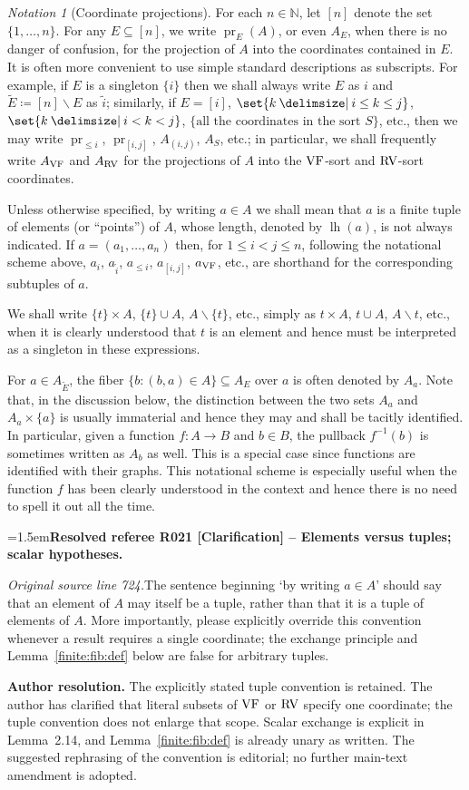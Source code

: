 \documentclass[12pt]{amsart}
\newcommand{\ResolvedRefereeRemark}[5]{%
  \par\medskip\begingroup\normalfont\small\color{gray}%
  \emergencystretch=1.5em\noindent\textbf{Resolved referee R#1 [#2] -- #3.}\par\nobreak\noindent #4\par
  \medskip\color{ResolutionGreen}\noindent\textbf{Author resolution.} #5\par
  \endgroup\medskip
}
\theoremstyle{plain}
\theoremstyle{definition}
\theoremstyle{remark}
\newtheorem{nota}[thm]{Notation}
\numberwithin{equation}{section}
\theoremstyle{plain}
\newcommand{\VF}{\textup{VF}}
\newcommand{\RV}{\textup{RV}}
\DeclareMathOperator{\lh}{lh}
\DeclareMathOperator{\pr}{pr}
\newcommand{\N}{\mathds{N}}
\newcommand{\0}{\emptyset}
\newcommand{\fun}{\longrightarrow}
\newcommand{\sub}{\subseteq}
\newcommand{\mi}{\smallsetminus}
\providecommand\given{}
\newcommand\SetSymbol[1][]{%
\nonscript \: #1 \vert
\allowbreak
\nonscript\:
\mathopen{}}
\renewcommand\given{\SetSymbol[\delimsize]}
\begin{document}
\begin{nota}[Coordinate projections]\label{indexing}
For each $n \in \N$, let $[n]$ denote the set $\{1, \ldots, n\}$. For any $E \sub [n]$, we write $\pr_E(A)$, or even $A_E$, when there is no danger of confusion, for the projection of $A$ into the coordinates contained in $E$. It is often more convenient to use simple standard descriptions as subscripts. For example, if $E$ is a singleton $\{i\}$ then we shall always write $E$ as $i$ and $\tilde E \coloneqq [n] \mi E$ as $\tilde i$; similarly, if $E = [i]$, $\set{k \given  i \leq k \leq j}$, $\set{k \given  i < k < j}$, $\{\text{all the coordinates in the sort $S$}\}$, etc., then we may write $\pr_{\leq i}$, $\pr_{[i, j]}$, $A_{(i, j)}$, $A_{S}$, etc.; in particular, we shall frequently write $A_{\VF}$ and $A_{\RV}$ for the projections of $A$ into the $\VF$-sort and $\RV$-sort coordinates.


Unless otherwise specified, by writing $a \in A$ we shall mean that $a$ is a finite tuple of elements (or ``points'') of $A$, whose length, denoted by $\lh(a)$, is not always indicated. If $a = (a_1, \ldots, a_n)$ then, for $1 \leq i < j \leq n$, following the notational scheme above, $a_i$, $a_{\tilde i}$, $a_{\leq i}$, $a_{[i, j]}$, $a_{\VF}$, etc., are shorthand for the corresponding subtuples of $a$.

We shall write $\{t\} \times A$, $\{t\} \cup A$, $A \mi \{t\}$, etc., simply as $t \times A$, $t \cup A$, $A \mi t$, etc., when it is clearly understood that $t$ is an element and hence must be interpreted as a singleton in these expressions.

For $a \in A_{\tilde E}$, the fiber $\{b : ( b, a) \in A \} \sub A_E$ over $a$ is often denoted by $A_a$. Note that, in the discussion below, the distinction between the two sets $A_a$ and $A_a \times \{a\}$ is usually immaterial and hence they may and  shall be tacitly identified. In particular, given a function $f : A \fun B$ and $b \in B$, the pullback $f^{-1}(b)$ is sometimes written as $A_b$ as well. This is a special case since functions are identified with their graphs. This notational scheme is especially useful when the function $f$ has been clearly understood in the context and hence there is no need to spell it out all the time.
\end{nota}

\ResolvedRefereeRemark{021}{Clarification}{Elements versus tuples; scalar hypotheses}{%
\textit{Original source line 724.}\quad The sentence beginning `by writing $a\in A$' should say that an element of $A$ may itself be a tuple, rather than that it is a tuple of elements of $A$. More importantly, please explicitly override this convention whenever a result requires a single coordinate; the exchange principle and Lemma~\ref{finite:fib:def} below are false for arbitrary tuples.
}{The explicitly stated tuple convention is retained. The author has clarified that literal subsets of $\VF$ or $\RV$ specify one coordinate; the tuple convention does not enlarge that scope. Scalar exchange is explicit in Lemma~2.14, and Lemma~\ref{finite:fib:def} is already unary as written. The suggested rephrasing of the convention is editorial; no further main-text amendment is adopted.}
\end{document}
